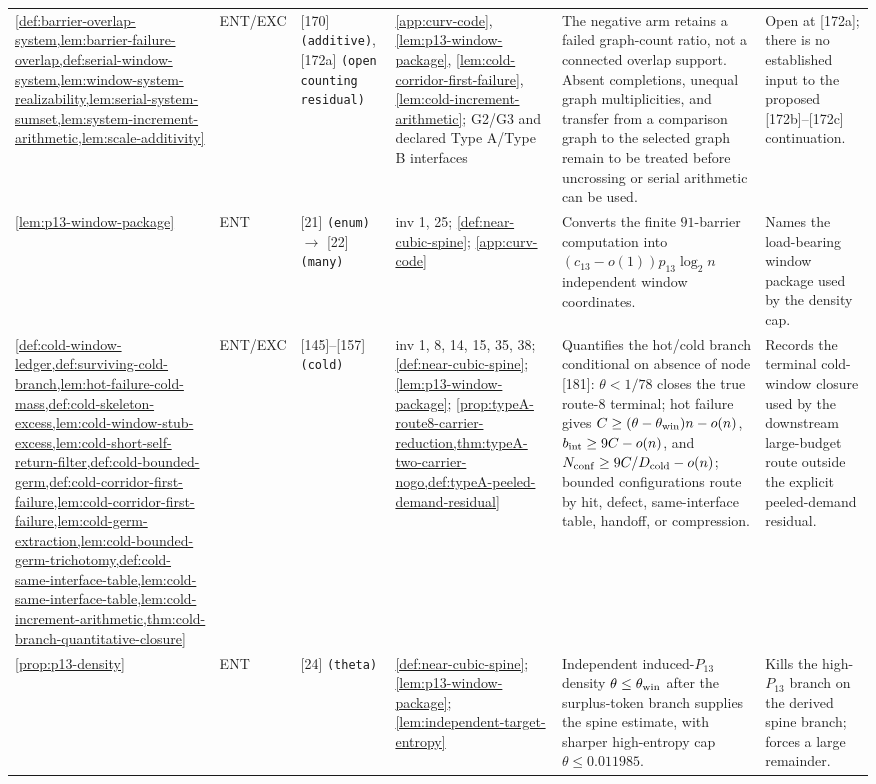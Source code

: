 \documentclass[11pt]{article}
\begin{document}
{\begin{longtable}{L{0.10\textwidth} C{0.045\textwidth} L{0.13\textwidth} L{0.135\textwidth} L{0.28\textwidth} L{0.20\textwidth}}
\cref{def:barrier-overlap-system,lem:barrier-failure-overlap,def:serial-window-system,lem:window-system-realizability,lem:serial-system-sumset,lem:system-increment-arithmetic,lem:scale-additivity} & ENT\slash EXC & [170] \texttt{(additive)}, [172a] \texttt{(open counting residual)} & \cref{app:curv-code}, \cref{lem:p13-window-package}, \cref{lem:cold-corridor-first-failure}, \cref{lem:cold-increment-arithmetic}; G2/G3 and declared Type A/Type B interfaces & The negative arm retains a failed graph-count ratio, not a connected overlap support.  Absent completions, unequal graph multiplicities, and transfer from a comparison graph to the selected graph remain to be treated before uncrossing or serial arithmetic can be used. & Open at [172a]; there is no established input to the proposed [172b]--[172c] continuation. \\
\cref{lem:p13-window-package} & ENT & [21] \texttt{(enum)} $\to$ [22] \texttt{(many)} & inv 1, 25; \cref{def:near-cubic-spine}; \cref{app:curv-code} & Converts the finite \(91\)-barrier computation into \((c_{13}-o(1))p_{13}\log_2 n\) independent window coordinates. & Names the load-bearing window package used by the density cap. \\
\cref{def:cold-window-ledger,def:surviving-cold-branch,lem:hot-failure-cold-mass,def:cold-skeleton-excess,lem:cold-window-stub-excess,lem:cold-short-self-return-filter,def:cold-bounded-germ,def:cold-corridor-first-failure,lem:cold-corridor-first-failure,lem:cold-germ-extraction,lem:cold-bounded-germ-trichotomy,def:cold-same-interface-table,lem:cold-same-interface-table,lem:cold-increment-arithmetic,thm:cold-branch-quantitative-closure} & ENT\slash EXC & [145]--[157] \texttt{(cold)} & inv 1, 8, 14, 15, 35, 38; \cref{def:near-cubic-spine}; \cref{lem:p13-window-package}; \cref{prop:typeA-route8-carrier-reduction,thm:typeA-two-carrier-nogo,def:typeA-peeled-demand-residual} & Quantifies the hot/cold branch conditional on absence of node [181]: \(\theta<1/78\) closes the true route-8 terminal; hot failure gives \(C\ge(\theta-\theta_{\rm win})n-o(n)\), \(b_{\rm int}\ge9C-o(n)\), and \(N_{\rm conf}\ge9C/D_{\rm cold}-o(n)\); bounded configurations route by hit, defect, same-interface table, handoff, or compression. & Records the terminal cold-window closure used by the downstream large-budget route outside the explicit peeled-demand residual. \\
\cref{prop:p13-density} & ENT & [24] \texttt{(theta)} & \cref{def:near-cubic-spine}; \cref{lem:p13-window-package}; \cref{lem:independent-target-entropy} & Independent induced-$P_{13}$ density $\theta\le\theta_{\rm win}$ after the surplus-token branch supplies the spine estimate, with sharper high-entropy cap $\theta\le0.011985$. & Kills the high-$P_{13}$ branch on the derived spine branch; forces a large remainder. \\
\bottomrule
\end{longtable}
}
\end{document}
